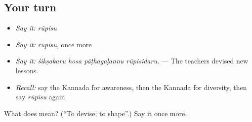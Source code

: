 \subsection*{Your turn}
\begin{itemize}
\raggedright
  \item \emph{Say it:} \emph{rūpisu}
  \item \emph{Say it:} \emph{rūpisu}, once more
  \item \emph{Say it:} \emph{śikṣakaru hosa pāṭhagaḷannu rūpisidaru.} — The teachers devised new lessons.
  \item \emph{Recall:} say the Kannada for awareness, then the Kannada for diversity, then say \emph{rūpisu} again
\end{itemize}

\begin{tcolorbox}[breakable,colback=teal!4,colframe=teal!35!black,title={Before you move on}]
What does  mean? (\textquotedblleft{}To devise; to shape\textquotedblright{}.) Say it once more.
\end{tcolorbox}
